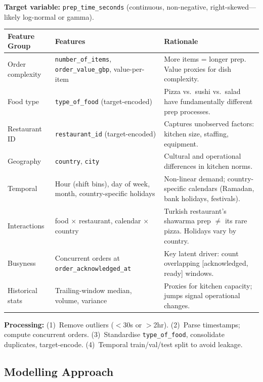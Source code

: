 \documentclass[11pt,a4paper]{article}
\begin{document}
\textbf{Target variable:} \texttt{prep\_time\_seconds} (continuous, non-negative, right-skewed---likely log-normal or gamma).

\vspace{-0.5em}
\begin{table}[h]
\centering\small
\begin{tabular}{@{}p{2.8cm}p{4.2cm}p{7.5cm}@{}}
\toprule
\textbf{Feature Group} & \textbf{Features} & \textbf{Rationale} \\
\midrule
Order complexity & \texttt{number\_of\_items}, \texttt{order\_value\_gbp}, value-per-item & More items = longer prep. Value proxies for dish complexity. \\
Food type & \texttt{type\_of\_food} (target-encoded) & Pizza vs.\ sushi vs.\ salad have fundamentally different prep processes. \\
Restaurant ID & \texttt{restaurant\_id} (target-encoded) & Captures unobserved factors: kitchen size, staffing, equipment. \\
Geography & \texttt{country}, \texttt{city} & Cultural and operational differences in kitchen norms. \\
Temporal & Hour (shift bins), day of week, month, country-specific holidays & Non-linear demand; country-specific calendars (Ramadan, bank holidays, festivals). \\
Interactions & food $\times$ restaurant, calendar $\times$ country & Turkish restaurant's shawarma prep $\neq$ its rare pizza. Holidays vary by country. \\
Busyness & Concurrent orders at \texttt{order\_acknowledged\_at} & Key latent driver: count overlapping [acknowledged, ready] windows. \\
Historical stats & Trailing-window median, volume, variance & Proxies for kitchen capacity; jumps signal operational changes. \\
\bottomrule
\end{tabular}
\end{table}
\vspace{-0.5em}

\textbf{Processing:} (1)~Remove outliers ($<$30s or $>$2hr). (2)~Parse timestamps; compute concurrent orders. (3)~Standardise \texttt{type\_of\_food}, consolidate duplicates, target-encode. (4)~Temporal train/val/test split to avoid leakage.

\subsection{Modelling Approach}
\end{document}
